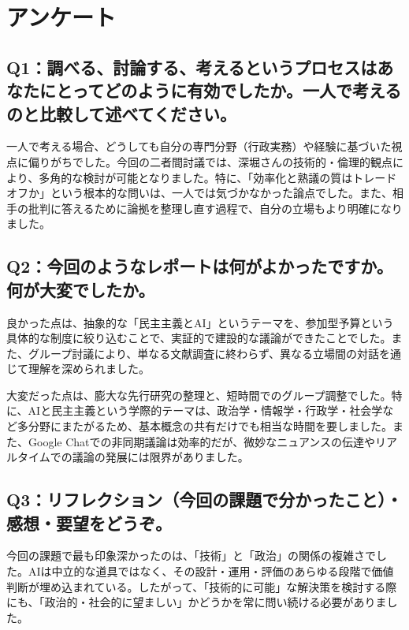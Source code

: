 \documentclass[12pt,a4j]{jarticle}
\begin{document}
\section{アンケート}

\subsection{Q1：調べる、討論する、考えるというプロセスはあなたにとってどのように有効でしたか。一人で考えるのと比較して述べてください。}

一人で考える場合、どうしても自分の専門分野（行政実務）や経験に基づいた視点に偏りがちでした。今回の二者間討議では、深堀さんの技術的・倫理的観点により、多角的な検討が可能となりました。特に、「効率化と熟議の質はトレードオフか」という根本的な問いは、一人では気づかなかった論点でした。また、相手の批判に答えるために論拠を整理し直す過程で、自分の立場もより明確になりました。

\subsection{Q2：今回のようなレポートは何がよかったですか。何が大変でしたか。}

良かった点は、抽象的な「民主主義とAI」というテーマを、参加型予算という具体的な制度に絞り込むことで、実証的で建設的な議論ができたことでした。また、グループ討議により、単なる文献調査に終わらず、異なる立場間の対話を通じて理解を深められました。

大変だった点は、膨大な先行研究の整理と、短時間でのグループ調整でした。特に、AIと民主主義という学際的テーマは、政治学・情報学・行政学・社会学など多分野にまたがるため、基本概念の共有だけでも相当な時間を要しました。また、Google Chatでの非同期議論は効率的だが、微妙なニュアンスの伝達やリアルタイムでの議論の発展には限界がありました。

\subsection{Q3：リフレクション（今回の課題で分かったこと）・感想・要望をどうぞ。}

今回の課題で最も印象深かったのは、「技術」と「政治」の関係の複雑さでした。AIは中立的な道具ではなく、その設計・運用・評価のあらゆる段階で価値判断が埋め込まれている。したがって、「技術的に可能」な解決策を検討する際にも、「政治的・社会的に望ましい」かどうかを常に問い続ける必要がありました。
\end{document}
